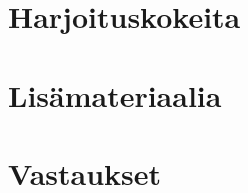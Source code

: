 \liitetyyli







\section{Harjoituskokeita}




\section{Lisämateriaalia}

%



% 



%


\newpage
\section{Vastaukset}
\begin{vastaussivu}

\end{vastaussivu}
